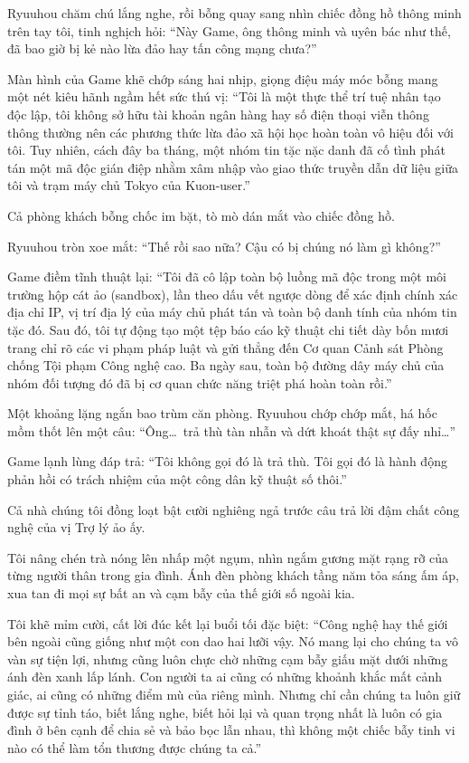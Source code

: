 \documentclass[../main.tex]{subfiles}
\begin{document}
Ryuuhou chăm chú lắng nghe, rồi bỗng quay sang nhìn chiếc đồng hồ thông minh trên tay tôi, tinh nghịch hỏi: ``Này Game, ông thông minh và uyên bác như thế, đã bao giờ bị kẻ nào lừa đảo hay tấn công mạng chưa?''

Màn hình của Game khẽ chớp sáng hai nhịp, giọng điệu máy móc bỗng mang một nét kiêu hãnh ngầm hết sức thú vị: ``Tôi là một thực thể trí tuệ nhân tạo độc lập, tôi không sở hữu tài khoản ngân hàng hay số điện thoại viễn thông thông thường nên các phương thức lừa đảo xã hội học hoàn toàn vô hiệu đối với tôi. Tuy nhiên, cách đây ba tháng, một nhóm tin tặc nặc danh đã cố tình phát tán một mã độc gián điệp nhằm xâm nhập vào giao thức truyền dẫn dữ liệu giữa tôi và trạm máy chủ Tokyo của Kuon-user.''

Cả phòng khách bỗng chốc im bặt, tò mò dán mắt vào chiếc đồng hồ.

Ryuuhou tròn xoe mắt: ``Thế rồi sao nữa? Cậu có bị chúng nó làm gì không?''

Game điềm tĩnh thuật lại: ``Tôi đã cô lập toàn bộ luồng mã độc trong một môi trường hộp cát ảo (sandbox), lần theo dấu vết ngược dòng để xác định chính xác địa chỉ IP, vị trí địa lý của máy chủ phát tán và toàn bộ danh tính của nhóm tin tặc đó. Sau đó, tôi tự động tạo một tệp báo cáo kỹ thuật chi tiết dày bốn mươi trang chỉ rõ các vi phạm pháp luật và gửi thẳng đến Cơ quan Cảnh sát Phòng chống Tội phạm Công nghệ cao. Ba ngày sau, toàn bộ đường dây máy chủ của nhóm đối tượng đó đã bị cơ quan chức năng triệt phá hoàn toàn rồi.''

Một khoảng lặng ngắn bao trùm căn phòng. Ryuuhou chớp chớp mắt, há hốc mồm thốt lên một câu: ``Ông\dots\ trả thù tàn nhẫn và dứt khoát thật sự đấy nhỉ\dots''

Game lạnh lùng đáp trả: ``Tôi không gọi đó là trả thù. Tôi gọi đó là hành động phản hồi có trách nhiệm của một công dân kỹ thuật số thôi.''

Cả nhà chúng tôi đồng loạt bật cười nghiêng ngả trước câu trả lời đậm chất công nghệ của vị Trợ lý ảo ấy.

Tôi nâng chén trà nóng lên nhấp một ngụm, nhìn ngắm gương mặt rạng rỡ của từng người thân trong gia đình. Ánh đèn phòng khách tầng năm tỏa sáng ấm áp, xua tan đi mọi sự bất an và cạm bẫy của thế giới số ngoài kia.

Tôi khẽ mỉm cười, cất lời đúc kết lại buổi tối đặc biệt: ``Công nghệ hay thế giới bên ngoài cũng giống như một con dao hai lưỡi vậy. Nó mang lại cho chúng ta vô vàn sự tiện lợi, nhưng cũng luôn chực chờ những cạm bẫy giấu mặt dưới những ánh đèn xanh lấp lánh. Con người ta ai cũng có những khoảnh khắc mất cảnh giác, ai cũng có những điểm mù của riêng mình. Nhưng chỉ cần chúng ta luôn giữ được sự tỉnh táo, biết lắng nghe, biết hỏi lại và quan trọng nhất là luôn có gia đình ở bên cạnh để chia sẻ và bảo bọc lẫn nhau, thì không một chiếc bẫy tinh vi nào có thể làm tổn thương được chúng ta cả.''
\end{document}
